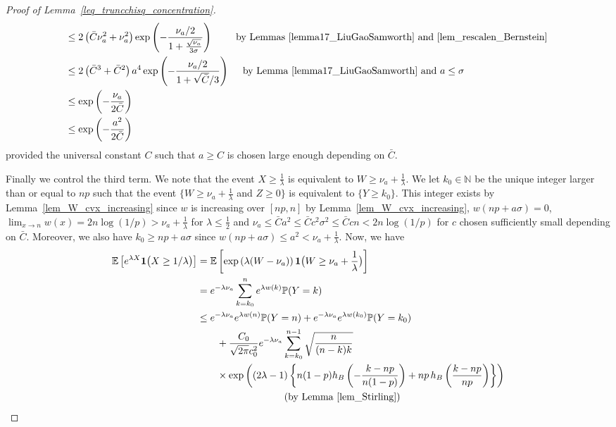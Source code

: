 \documentclass{article}
\newcommand{\one}{\mathbf{1}}
\begin{document}
\begin{proof}[Proof of Lemma~\ref{leq_truncchisq_concentration}]
$$\begin{aligned}
    & \leq 2\left(\bar C \nu_a^2 + \nu_a^2\right) \exp\left(- \frac{\nu_a/2}{1+\frac{\sqrt{\nu_a}}{3\sigma}}\right) \qquad \text{ by Lemmas~\ref{lemma17_LiuGaoSamworth} and~\ref{lem_rescalen_Bernstein} }\\
    & \leq 2 \left(\bar C^3 + \bar C^2\right)a^4 \exp\left(-\frac{\nu_a/2}{1+ \sqrt{\bar C}/3}\right) \quad \text{ by Lemma~\ref{lemma17_LiuGaoSamworth} and } a \leq \sigma\\
    & \leq \exp\left(-\frac{\nu_a}{2\bar C}\right)\\
    & \leq \exp\left(-\frac{a^2}{2\bar C}\right)
\end{aligned}
$$
provided the universal constant $C$ such that $a \geq C$ is chosen large enough depending on $\bar C$.

Finally we control the third term. 
We note that the event $X\geq\frac{1}{\lambda}$ is equivalent to $W \geq \nu_a + \frac{1}{\lambda}$. 
We let $k_0 \in \mathbb N$ be the unique integer larger than or equal to $np$ such that the event $\big\{W \geq \nu_a + \frac{1}{\lambda}$ and $Z \geq 0 \big\}$ is equivalent to $\{Y \geq k_0\}$. 
This integer exists by Lemma~\ref{lem_W_cvx_increasing} since $w$ is increasing over $[np,n]$ by Lemma~\ref{lem_W_cvx_increasing}, $w(np + a\sigma) = 0$, $\lim_{x \to n} w(x) = 2 n \log(1/p) > \nu_a + \frac{1}{\lambda}$ for $\lambda \leq \frac{1}{2}$ and $\nu_a \leq \bar C a^2 \leq \bar C c^2 \sigma^2 \leq \bar C c n < 2 n \log(1/p)$ for $c$ chosen sufficiently small depending on $\bar C$. 
Moreover, we also have $k_0 \geq np + a\sigma$ since 
$w(np+a\sigma) \leq a^2 < \nu_a + \frac{1}{\lambda}$.
Now, we have
\begin{align*}
\mathbb E\left[e^{\lambda X} \one{\big(X\geq1/\lambda\big)}\right] &= \mathbb E\left[\exp\left(\lambda(W - \nu_a)\right)\one{\big(W \geq \nu_a + \frac{1}{\lambda}\big)}\right]\\
& = e^{-\lambda \nu_a}  \sum_{k = k_0}^n e^{\lambda w(k)}\mathbb P(Y = k)\\
& \leq e^{-\lambda \nu_a}   e^{\lambda w(n)}\mathbb P(Y = n) + e^{-\lambda \nu_a}   e^{\lambda w(k_0)}\mathbb P(Y = k_0) \\
& \qquad + \frac{C_0}{\sqrt{2\pi}c_0^2} e^{-\lambda \nu_a} \sum_{k = k_0}^{n-1} \sqrt{\frac{n}{(n-k)k}} \\
& \qquad \times \exp\left((2\lambda - 1) \left\{n(1-p) h_B\left(-\frac{k-np}{n(1-p)}\right) + np \, h_B\left(\frac{k-np}{np}\right)\right\}\right) \\
&\hspace{3cm} \text{ (by Lemma~\ref{lem_Stirling})}\\

\end{align*}
\end{proof}
\end{document}
